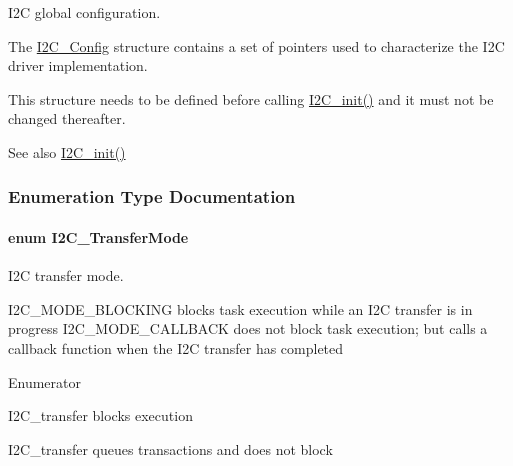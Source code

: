 I2\+C global configuration. 

The \hyperlink{struct_i2_c___config}{I2\+C\+\_\+\+Config} structure contains a set of pointers used to characterize the I2\+C driver implementation.

This structure needs to be defined before calling \hyperlink{_i2_c_8h_a9ff51ddf1d325776fef90cce0223772b}{I2\+C\+\_\+init()} and it must not be changed thereafter.

\begin{DoxySeeAlso}{See also}
\hyperlink{_i2_c_8h_a9ff51ddf1d325776fef90cce0223772b}{I2\+C\+\_\+init()} 
\end{DoxySeeAlso}


\subsubsection{Enumeration Type Documentation}
\paragraph[{I2\+C\+\_\+\+Transfer\+Mode}]{\setlength{\rightskip}{0pt plus 5cm}enum {\bf I2\+C\+\_\+\+Transfer\+Mode}}\label{_i2_c_8h_a39f3b9340fc4ee241b0d2da9b2841c26}


I2\+C transfer mode. 

I2\+C\+\_\+\+M\+O\+D\+E\+\_\+\+B\+L\+O\+C\+K\+I\+N\+G blocks task execution while an I2\+C transfer is in progress I2\+C\+\_\+\+M\+O\+D\+E\+\_\+\+C\+A\+L\+L\+B\+A\+C\+K does not block task execution; but calls a callback function when the I2\+C transfer has completed \begin{Desc}
\item[Enumerator]\par
\begin{description}
\item[{\em 
I2\+C\+\_\+\+M\+O\+D\+E\+\_\+\+B\+L\+O\+C\+K\+I\+N\+G\label{_i2_c_8h_a39f3b9340fc4ee241b0d2da9b2841c26abe065350be2a0ae5c9beb24624626c75}
}]I2\+C\+\_\+transfer blocks execution \item[{\em 
I2\+C\+\_\+\+M\+O\+D\+E\+\_\+\+C\+A\+L\+L\+B\+A\+C\+K\label{_i2_c_8h_a39f3b9340fc4ee241b0d2da9b2841c26a129731a7edeb285f43a54b2cf9f5ac72}
}]I2\+C\+\_\+transfer queues transactions and does not block \end{description}
\end{Desc}
